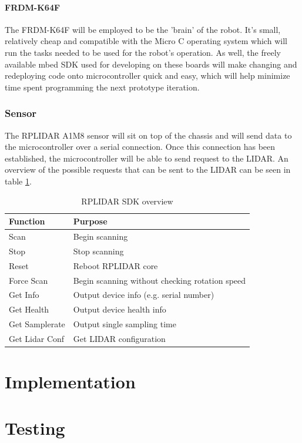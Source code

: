 		\subsubsection{FRDM-K64F}
		The FRDM-K64F will be employed to be the 'brain' of the robot. It's small, relatively cheap and compatible with the Micro C operating system which will run the tasks needed to be used for the robot's operation. As well, the freely available mbed SDK used for developing on these boards will make changing and redeploying code onto microcontroller quick and easy, which will help minimize time spent programming the next prototype iteration.
	
		\subsection{Sensor}
		The RPLIDAR A1M8 sensor will sit on top of the chassis and will send data to the microcontroller over a serial connection. Once this connection has been established, the microcontroller will be able to send request to the LIDAR. An overview of the possible requests that can be sent to the LIDAR can be seen in table \ref{table:2}.
		
		\begin{table}[h!]
			\centering
			\begin{tabular}{|| l | l ||} 
				\hline
				Function & Purpose  \\ [0.5ex] 
				\hline
				Scan & Begin scanning  \\ 
				Stop & Stop scanning  \\
				Reset & Reboot RPLIDAR core  \\
				Force Scan & Begin scanning without checking rotation speed  \\
				Get Info & Output device info (e.g. serial number)  \\
				Get Health & Output device health info  \\
				Get Samplerate & Output single sampling time  \\
				Get Lidar Conf & Get LIDAR configuration  \\ [1ex] 
				\hline
			\end{tabular}
			\caption{RPLIDAR SDK overview}
			\label{table:2}
		\end{table}
		

		
	\chapter{Implementation}
	\chapter{Testing}